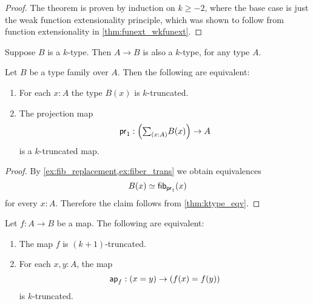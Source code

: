 \begin{proof}
The theorem is proven by induction on $k\geq -2$, where the base case is just the weak function extensionality principle, which was shown to follow from function extensionality in \autoref{thm:funext_wkfunext}.
\end{proof}

\begin{cor}\label{cor:funtype_trunc}
Suppose $B$ is a $k$-type. Then $A\to B$ is also a $k$-type, for any type $A$.
\end{cor}

\begin{thm}
Let $B$ be a type family over $A$. Then the following are equivalent:
\begin{enumerate}
\item For each $x:A$ the type $B(x)$ is $k$-truncated.
\item The projection map
\begin{equation*}
\proj 1 : \Big(\sm{x:A}B(x)\Big)\to A
\end{equation*}
is a $k$-truncated map.
\end{enumerate}
\end{thm}

\begin{proof}
By \cref{ex:fib_replacement,ex:fiber_trans} we obtain equivalences
\begin{equation*}
\eqv{B(x)}{\fib{\proj 1}{x}}
\end{equation*}
for every $x:A$. Therefore the claim follows from \cref{thm:ktype_eqv}.
\end{proof}

\begin{thm}\label{thm:trunc_ap}
Let $f:A\to B$ be a map. The following are equivalent:
\begin{enumerate}
\item The map $f$ is $(k+1)$-truncated.
\item For each $x,y:A$, the map
\begin{equation*}
\mathsf{ap}_{f} : (x=y)\to (f(x)=f(y))
\end{equation*}
is $k$-truncated. 
\end{enumerate}
\end{thm}

